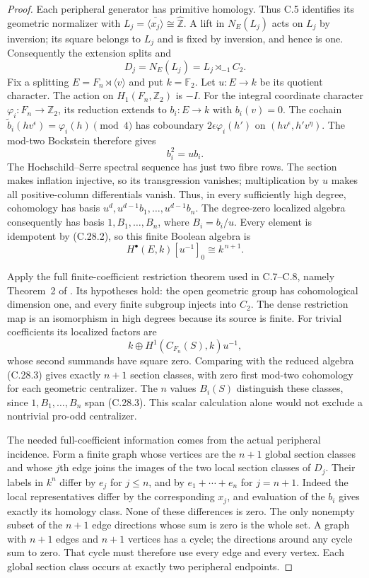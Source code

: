 \begin{proof}
Each peripheral generator has primitive homology.  Thus
C.5 identifies its geometric normalizer with
$L_j=\overline{\langle x_j\rangle}\cong\widehat{\mathbb Z}$.
A lift in $N_E(L_j)$ acts on $L_j$ by inversion; its square
belongs to $L_j$ and is fixed by inversion, and hence is one.
Consequently the extension splits and
\[
               D_j=N_E(L_j)=L_j\rtimes_{-1}C_2.
\]
Fix a splitting $E=F_n\rtimes\langle v\rangle$ and put
$k=\mathbb F_2$.  Let $u:E\to k$ be its quotient character.
The action on $H_1(F_n,\mathbb Z_2)$ is $-I$.  For the
integral coordinate character $\varphi_i:F_n\to\mathbb Z_2$,
its reduction extends to $b_i:E\to k$ with $b_i(v)=0$.
The cochain
$\widetilde b_i(hv^\epsilon)=\varphi_i(h)\pmod4$
has coboundary $2\epsilon\varphi_i(h')$ on
$(hv^\epsilon,h'v^\eta)$.  The mod-two Bockstein therefore
gives
\[
                            b_i^2=ub_i.                 \tag{C.28.2}
\]
The Hochschild--Serre spectral sequence has just two fibre
rows.  The section makes inflation injective, so its
transgression vanishes; multiplication by $u$ makes all
positive-column differentials vanish.  Thus, in every
sufficiently high degree, cohomology has basis
$u^d,u^{d-1}b_1,\ldots,u^{d-1}b_n$.  The degree-zero
localized algebra consequently has basis
$1,B_1,\ldots,B_n$, where $B_i=b_i/u$.  Every element is
idempotent by (C.28.2), so this finite Boolean algebra is
\[
                     H^\bullet(E,k)[u^{-1}]_0
                           \cong k^{\,n+1}.              \tag{C.28.3}
\]

Apply the full finite-coefficient restriction theorem
used in C.7--C.8, namely Theorem~2 of
\cite{CEKochloukovaZalesskii2007}.  Its hypotheses hold:
the open geometric group has cohomological dimension one,
and every finite subgroup injects into $C_2$.  The dense
restriction map is an isomorphism in high degrees because
its source is finite.  For trivial coefficients its
localized factors are
\[
       k\oplus H^1(C_{F_n}(S),k)u^{-1},
\]
whose second summands have square zero.  Comparing with
the reduced algebra (C.28.3) gives exactly $n+1$ section
classes, with zero first mod-two cohomology for each
geometric centralizer.  The $n$ values $B_i(S)$ distinguish
these classes, since $1,B_1,\ldots,B_n$ span (C.28.3).
This scalar calculation alone would not exclude a
nontrivial pro-odd centralizer.

The needed full-coefficient information comes from the
actual peripheral incidence.  Form a finite graph whose
vertices are the $n+1$ global section classes and whose
$j$th edge joins the images of the two local section
classes of $D_j$.  Their labels in $k^n$ differ by
$e_j$ for $j\leq n$, and by $e_1+\cdots+e_n$ for
$j=n+1$.  Indeed the local representatives differ by
the corresponding $x_j$, and evaluation of the $b_i$
gives exactly its homology class.  None of these
differences is zero.  The only nonempty subset of the
$n+1$ edge directions whose sum is zero is the whole
set.  A graph with $n+1$ edges and $n+1$ vertices
has a cycle; the directions around any cycle sum to
zero.  That cycle must therefore use every edge and
every vertex.  Each global section class occurs at
exactly two peripheral endpoints.


\end{proof}
